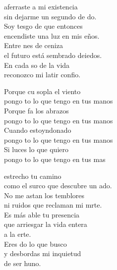 \begin{cancion}%
	 aferraste a mi existencia  \\
	sin dejarme un segundo de do.  \\
	Soy tesgo de que entonces  \\
	encendiste una luz en mis eños.  \\
	Entre nes de ceniza \\
	el futuro está sembrado deiedos.  \\
	En cada so de la vida \\
	reconozco mi latir confio.\jump\\
	\begin{chorus}%
		Porque cu sopla el viento  \\
		pongo to lo que tengo en tus manos \\
		Porque fa los abrazos  \\
		pongo to lo que tengo en tus manos \\
		Cuando estoyndonado  \\
		pongo to lo que tengo en tus manos \\
		Si luces lo que quiero  \\
		pongo to lo que tengo en tus mas \jump\\
	\end{chorus}%
	 estrecho tu camino \\
	como el surco que descubre un ado. \\
	No me astan los temblores \\
	ni ruidos que reclaman mi mrte.\\
	Es más able tu presencia \\
	\jump
que arriesgar la vida entera\\
	a la erte.\\
	Eres do lo que busco \\
	\jump
y desbordas mi inquietud\\
	de ser huno.\\
\end{cancion}%

